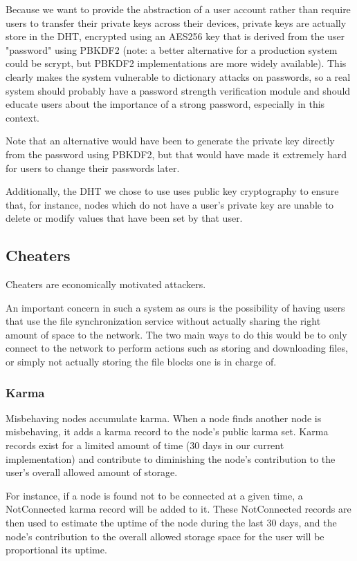 \documentclass[11pt]{IEEEtran}
\begin{document}
Because we want to provide the abstraction of a user account rather than require users to transfer their private keys across their devices, private keys are actually store in the DHT, encrypted using an AES256 key that is derived from the user "password" using PBKDF2\cite{PBKDF2} (note: a better alternative for a production system could be scrypt\cite{scrypt}, but PBKDF2 implementations are more widely available). This clearly makes the system vulnerable to dictionary attacks on passwords, so a real system should probably have a password strength verification module and should educate users about the importance of a strong password, especially in this context.

Note that an alternative would have been to generate the private key directly from the password using PBKDF2, but that would have made it extremely hard for users to change their passwords later.

Additionally, the DHT we chose to use uses public key cryptography to ensure that, for instance, nodes which do not have a user's private key are unable to delete or modify values that have been set by that user. 

\subsection{Cheaters}

Cheaters are economically motivated attackers.

An important concern in such a system as ours is the possibility of having users that use the file synchronization service without actually sharing the right amount of space to the network. The two main ways to do this would be to only connect to the network to perform actions such as storing and downloading files, or simply not actually storing the file blocks one is in charge of. 

\subsubsection{Karma}

Misbehaving nodes accumulate karma. When a node finds another node is misbehaving, it adds a karma record to the node's public karma set. Karma records exist for a limited amount of time (30 days in our current implementation) and contribute to diminishing the node's contribution to the user's overall allowed amount of storage.

For instance, if a node is found not to be connected at a given time, a NotConnected karma record will be added to it. These NotConnected records are then used to estimate the uptime of the node during the last 30 days, and the node's contribution to the overall allowed storage space for the user will be proportional its uptime. 
\end{document}
